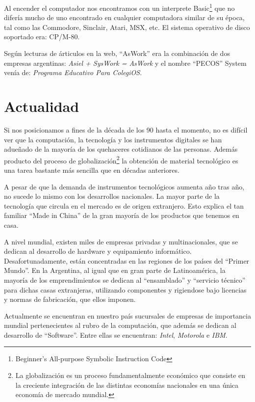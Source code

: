 \documentclass[%
 	final,
%
	notitlepage,
	narroweqnarray,
	inline,
 	twoside,
	]{ieee}
\begin{document}
Al encender el computador nos encontramos con un interprete Basic\footnote{Beginner's All-purpose Symbolic Instruction Code} que no difer\'ia mucho de uno encontrado en cualquier computadora similar de su \'epoca, tal como las Commodore, Sinclair, Atari, MSX, etc. El sistema operativo de disco soportado era: CP/M-80.

Seg\'un lecturas de \'articulos en la web\cite{pecos}, ``AsWork'' era la combinaci\'on de dos empresas argentinas: \textit{Asiel + SysWork = AsWork} y el nombre ``PECOS'' System ven\'ia de: \textit{Programa Educativo Para ColegiOS.}


\section{Actualidad }
Si nos posicionamos a fines de la d\'ecada de los 90 hasta el momento, no es dif\'icil ver que la computaci\'on, la tecnolog\'ia y los instrumentos digitales se han adue\~nado de la mayor\'ia de los quehaceres cotidianos de las personas. Adem\'as producto del proceso de globalizaci\'on\footnote{La globalizaci\'on es un proceso fundamentalmente econ\'omico que consiste en la creciente integraci\'on de las distintas econom\'ias nacionales en una \'unica econom\'ia de mercado mundial.} la obtenci\'on de material tecnol\'ogico es una tarea bastante m\'as sencilla que en d\'ecadas anteriores.

A pesar de que la demanda de instrumentos tecnol\'ogicos aumenta a\~no tras a\~no, no sucede lo mismo con los desarrollos nacionales. La mayor parte de la tecnolog\'ia que circula en el mercado es de origen extranjero. Esto explica el tan familiar ``Made in China'' de la gran mayor\'ia de los productos que tenemos en casa.

A nivel mundial, existen miles de empresas privadas y multinacionales, que se dedican al desarrollo de hardware y equipamiento inform\'atico. Desafortunadamente, est\'an concentradas en las regiones de los pa\'ises del ``Primer Mundo''. En la Argentina, al igual que en gran parte de Latinoam\'erica, la mayor\'ia de los emprendimientos se dedican al ``ensamblado'' y ``servicio t\'ecnico'' para dichas casas extranjeras, utilizando componentes y rigiendose bajo licencias y normas de fabricaci\'on, que ellos imponen.

Actualmente se encuentran en nuestro pa\'is sucursales de empresas de importancia mundial pertenecientes al rubro de la computaci\'on, que adem\'as se dedican al desarrollo de ``Software''. Entre ellas se encuentran: \textit{Intel}, \textit{Motorola} e \textit{IBM}.
\end{document}
